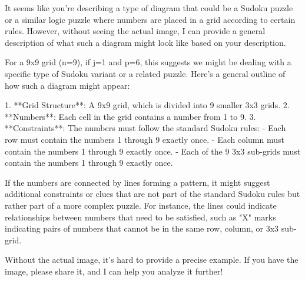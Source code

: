 It seems like you're describing a type of diagram that could be a Sudoku puzzle or a similar logic puzzle where numbers are placed in a grid according to certain rules. However, without seeing the actual image, I can provide a general description of what such a diagram might look like based on your description.

For a 9x9 grid (n=9), if j=1 and p=6, this suggests we might be dealing with a specific type of Sudoku variant or a related puzzle. Here's a general outline of how such a diagram might appear:

1. **Grid Structure**: A 9x9 grid, which is divided into 9 smaller 3x3 grids.
2. **Numbers**: Each cell in the grid contains a number from 1 to 9.
3. **Constraints**: The numbers must follow the standard Sudoku rules:
   - Each row must contain the numbers 1 through 9 exactly once.
   - Each column must contain the numbers 1 through 9 exactly once.
   - Each of the 9 3x3 sub-grids must contain the numbers 1 through 9 exactly once.

If the numbers are connected by lines forming a pattern, it might suggest additional constraints or clues that are not part of the standard Sudoku rules but rather part of a more complex puzzle. For instance, the lines could indicate relationships between numbers that need to be satisfied, such as "X" marks indicating pairs of numbers that cannot be in the same row, column, or 3x3 sub-grid.

Without the actual image, it's hard to provide a precise example. If you have the image, please share it, and I can help you analyze it further!